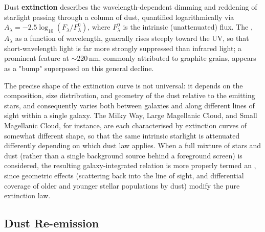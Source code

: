 \begin{minipage}{0.55\textwidth}
Dust \textbf{extinction} describes the wavelength-dependent dimming and reddening of starlight passing through a column of dust, quantified logarithmically via $A_\lambda = -2.5\log_{10}(F_\lambda/F_\lambda^0)$, where $F_\lambda^0$ is the intrinsic (unattenuated) flux. The , $A_\lambda$ as a function of wavelength, generally rises steeply toward the UV, so that short-wavelength light is far more strongly suppressed than infrared light; a prominent feature at $\sim 220\,\text{nm}$, commonly attributed to graphite grains, appears as a "bump" superposed on this general decline.
\end{minipage}%
\hfill
\begin{minipage}{0.4\textwidth}
    \centering
\end{minipage}

\medskip

The precise shape of the extinction curve is not universal: it depends on the composition, size distribution, and geometry of the dust relative to the emitting stars, and consequently varies both between galaxies and along different lines of sight within a single galaxy. The Milky Way, Large Magellanic Cloud, and Small Magellanic Cloud, for instance, are each characterised by extinction curves of somewhat different shape, so that the same intrinsic starlight is attenuated differently depending on which dust law applies. When a full mixture of stars and dust (rather than a single background source behind a foreground screen) is considered, the resulting galaxy-integrated relation is more properly termed an , since geometric effects (scattering back into the line of sight, and differential coverage of older and younger stellar populations by dust) modify the pure extinction law.

\subsection{Dust Re-emission} \label{subsec:dust_reemission}

